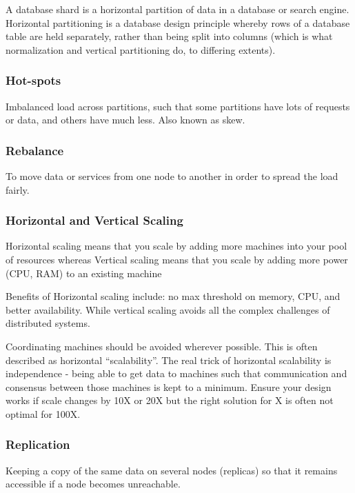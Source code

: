 \documentclass{article}
\begin{document}
    A database shard is a horizontal partition of data in a database or search engine. Horizontal partitioning is a database design principle whereby rows of a database table are held separately, rather than being split into columns (which is what normalization and vertical partitioning do, to differing extents).
    
    \subsubsection{Hot-spots}
    Imbalanced load across partitions, such that some partitions have lots of requests or data, and others have much less. Also known as skew.
    
    \subsubsection{Rebalance}
    To move data or services from one node to another in order to spread the load fairly.
    
    \subsubsection{Horizontal and Vertical Scaling}
    Horizontal scaling means that you scale by adding more machines into your pool of resources whereas Vertical scaling means that you scale by adding more power (CPU, RAM) to an existing machine 
    
    Benefits of Horizontal scaling include: no max threshold on memory, CPU, and better availability. While vertical scaling avoids all the complex challenges of distributed systems.
    
    Coordinating machines should be avoided wherever possible. This is often described as horizontal ``scalability”. The real trick of horizontal scalability is independence - being able to get data to machines such that communication and consensus between those machines is kept to a minimum.  Ensure your design works if scale changes by 10X or 20X but the right solution for X is often not optimal for 100X.
    
    
    \subsubsection{Replication}
    Keeping a copy of the same data on several nodes (replicas) so that it remains accessible if a node becomes unreachable.
    
\end{document}
